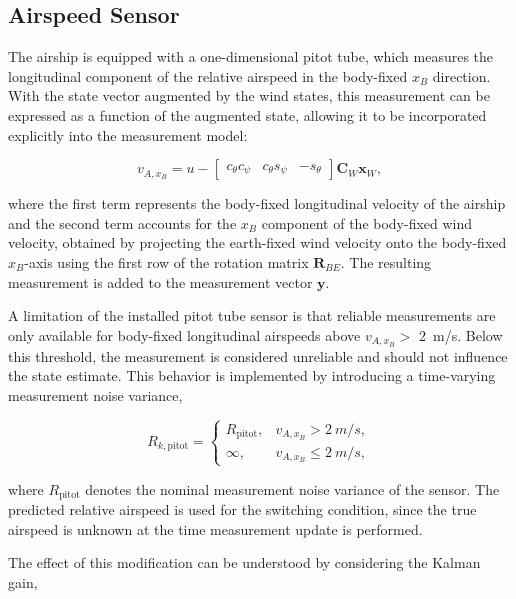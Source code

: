 \subsection{Airspeed Sensor}
\label{sec:PitotTube}

The airship is equipped with a one-dimensional pitot tube, which measures the longitudinal component of the relative airspeed in the body-fixed $x_B$ direction. With the state vector augmented by the wind states, this measurement can be expressed as a function of the augmented state, allowing it to be incorporated explicitly into the measurement model:

\begin{equation}
	v_{A,x_B}
	=
	u -
	\begin{bmatrix}
		c_\theta c_\psi &
		c_\theta s_\psi &
		-s_\theta
	\end{bmatrix}
	\bm{C}_W \bm{x}_W,
\end{equation}

where the first term represents the body-fixed longitudinal velocity of the
airship and the second term accounts for the $x_B$ component of the body-fixed wind velocity, obtained by projecting the earth-fixed wind velocity
onto the body-fixed $x_B$-axis using the first row
of the rotation matrix $\bm{R}_{BE}$. The resulting measurement is added to the measurement vector $\bm{y}$.

A limitation of the installed pitot tube sensor is that reliable measurements are only available for body-fixed longitudinal airspeeds above $v_{A,x_B} >$ \SI{2}{m/s}. Below this threshold, the measurement is considered unreliable and should not influence the state estimate. This behavior is implemented by introducing a time-varying measurement noise variance,

\begin{equation}
	R_{k,\mathrm{pitot}}
	=
	\begin{cases}
		R_{\mathrm{pitot}}, &
		v_{A,x_B} > \SI{2}{m/s}, 
		\\[4pt]
		\infty, &
		v_{A,x_B} \leq \SI{2}{m/s},
	\end{cases}
	\label{eq:pitot_noise}
\end{equation}

where $R_{\mathrm{pitot}}$ denotes the nominal measurement noise variance of
the sensor. The predicted relative airspeed is used for the switching
condition, since the true airspeed is unknown at the time measurement update is
performed.

The effect of this modification can be understood by considering the Kalman
gain,

